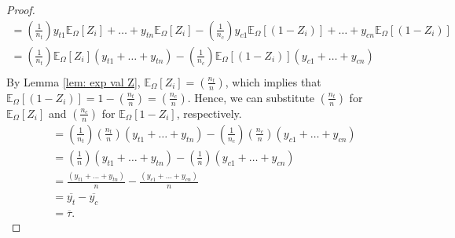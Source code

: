 \documentclass[12pt,leqno]{article}
\theoremstyle{newstyle}
\begin{document}
\begin{proof}
\begin{align*}
= \left(\frac{1}{n_t} \right) y_{t1}\mathbb{E}_{\Omega} \left[ Z_i \right] + \dots + y_{tn}\mathbb{E}_{\Omega} \left[Z_i\right] - \left(\frac{1}{n_c}\right) y_{c1}\mathbb{E}_{\Omega}\left[\left(1 - Z_i\right) \right] + \dots + y_{cn}\mathbb{E}_{\Omega} \left[\left(1 - Z_i\right) \right] \\
= \left(\frac{1}{n_t} \right) \mathbb{E}_{\Omega} \left[ Z_i \right] \left(y_{t1} + \dots + y_{tn} \right) - \left(\frac{1}{n_c}\right) \mathbb{E}_{\Omega}\left[\left(1 - Z_i\right) \right] \left(y_{c1} + \dots + y_{cn} \right) \\
\end{align*}
By Lemma \ref{lem: exp val Z}, $\mathbb{E}_{\Omega}\left[Z_i \right] = \left(\frac{n_t}{n}\right)$, which implies that $\mathbb{E}_{\Omega}\left[\left(1 - Z_i\right) \right] = 1 - \left(\frac{n_t}{n}\right) = \left(\frac{n_c}{n}\right)$. Hence, we can substitute $\left(\frac{n_t}{n}\right)$ for $\mathbb{E}_{\Omega}\left[Z_i \right]$ and $\left(\frac{n_c}{n}\right)$ for $\mathbb{E}_{\Omega}\left[1 - Z_i \right]$, respectively.
\begin{align*}
= \left(\frac{1}{n_t} \right) \left(\frac{n_t}{n}\right) \left(y_{t1} + \dots + y_{tn} \right) - \left(\frac{1}{n_c}\right) \left(\frac{n_c}{n}\right) \left(y_{c1} + \dots + y_{cn} \right) \\
= \left(\frac{1}{n} \right) \left(y_{t1} + \dots + y_{tn} \right) - \left(\frac{1}{n}\right) \left(y_{c1} + \dots + y_{cn} \right) \\
= \frac{\left(y_{t1} + \dots + y_{tn} \right)}{n} - \frac{\left(y_{c1} + \dots + y_{cn} \right)}{n} \\
= \overline{y_{t}} - \overline{y_{c}} \\
= \overline{\tau}.
\end{align*}
\end{proof}
\end{document}
